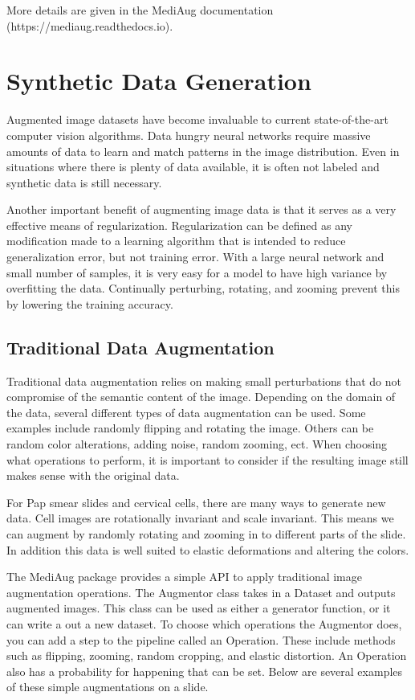 \documentclass[ms,electronic,oneside,twosidetoc,letterpaper,chaptercenter,parttop]{byumsphd}
\begin{document}
\vspace{5mm}

More details are given in the MediAug documentation (https://mediaug.readthedocs.io).

\chapter{Synthetic Data Generation}

Augmented image datasets have become invaluable to current state-of-the-art computer vision algorithms. Data hungry 
neural networks require massive amounts of data to learn and match patterns in the image distribution.
Even in situations where there is plenty of data available, it is often not labeled and synthetic data 
is still necessary.

Another important benefit of augmenting image data is that it serves as a very effective
means of regularization. Regularization can be defined as any modiﬁcation made to a 
learning algorithm that is intended to reduce generalization error, but not training error.
With a large neural network and small number of samples, it is very easy for a model to have high
variance by overfitting the data. Continually perturbing, rotating, and zooming prevent this by 
lowering the training accuracy.

\section{Traditional Data Augmentation}

Traditional data augmentation relies on making small perturbations that do not compromise
of the semantic content of the image. Depending on the domain of the data, several different types 
of data augmentation can be used. Some examples include randomly flipping and rotating the image. Others can be random color 
alterations, adding noise, random zooming, ect. When choosing what operations to perform, it is
important to consider if the resulting image still makes sense with the original data.

For Pap smear slides and cervical cells, there are many ways to generate new data. Cell images are
rotationally invariant and scale invariant. This means we can augment by randomly rotating and zooming in to different parts of the slide.
In addition this data is well suited to elastic deformations and altering the colors.

The MediAug package provides a simple API to apply traditional image augmentation operations.
The Augmentor class takes in a Dataset and outputs augmented images. This class can be used
as either a generator function, or it can write a out a new dataset. To choose which operations 
the Augmentor does, you can add a step to the pipeline called an Operation. These include methods
such as flipping, zooming, random cropping, and elastic distortion. An Operation also has a probability
for happening that can be set. Below are several examples of these simple augmentations on a slide.
\end{document}
